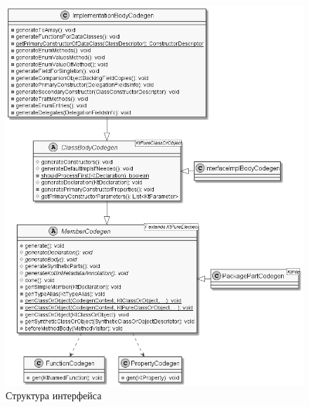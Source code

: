 \begin{figure}[htbp]
    \centering
    \includegraphics[width=\textwidth]{resources/06/06_member_codegen.png}
    \caption{Структура интерфейса }
    \label{fig05:binding-trace-scheme}
\end{figure}

